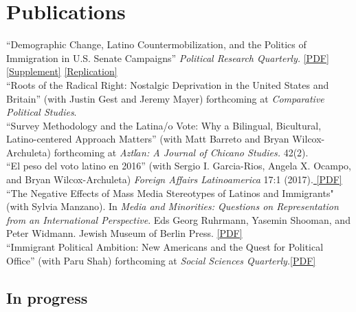 \documentclass[11pt, a4paper]{article}
\newcommand{\years}[1]{\marginnote{\scriptsize #1}}
\begin{document}
\section*{Publications}
\years{2017}``Demographic Change, Latino Countermobilization, and the Politics of Immigration in U.S. Senate Campaigns'' \textit{Political Research Quarterly.} \href{http://tylerreny.github.io/pdf/pubs/reny_2017_prq_final.pdf}{[PDF]} \href{http://tylerreny.github.io/pdf/pubs/reny_2017_prq_final_supp.pdf}{[Supplement]} \href{https://github.com/tylerreny/tylerreny.github.io/tree/master/replication/PRQ_2017}{[Replication]} \\
\years{2017}``Roots of the Radical Right: Nostalgic Deprivation in the United States and Britain'' (with Justin Gest and Jeremy Mayer) forthcoming at \textit{Comparative Political Studies}.\\
\years{2017} ``Survey Methodology and the Latina/o Vote: Why a Bilingual, Bicultural, Latino-centered Approach Matters'' (with Matt Barreto and Bryan Wilcox-Archuleta) forthcoming at \textit{Aztl$\acute{a}$n: A Journal of Chicano Studies.} 42(2).\\
\years{2017} ``El peso del voto latino en 2016'' (with Sergio I. Garcia-Rios, Angela X. Ocampo, and Bryan Wilcox-Archuleta) \textit{Foreign Affairs Latinoamerica} 17:1 (2017).\href{http://tylerreny.github.io/pdf/pubs/reny_et_al_2017_foreign_affairs.pdf}{ [PDF]}\\
\years{2016} ``The Negative Effects of Mass Media Stereotypes of Latinos and Immigrants" (with Sylvia Manzano). In \textit{Media and Minorities: Questions on Representation from an International Perspective}. Eds Georg Ruhrmann, Yasemin Shooman, and Peter Widmann. Jewish Museum of Berlin Press. \href{http://tylerreny.github.io/pdf/pubs/reny_manzano_stereotypes_2016.pdf}{[PDF]}\\
\years{2016} ``Immigrant Political Ambition:  New Americans and the Quest for Political Office'' (with Paru Shah) forthcoming at \textit{Social Sciences Quarterly.}\href{https://www.dropbox.com/s/monmlmhaaowg5vp/Immigrant%20Political%20Ambition%20SSQ%20Final.pdf?dl=0}{[PDF]}\\

\subsection*{In progress}
\end{document}
